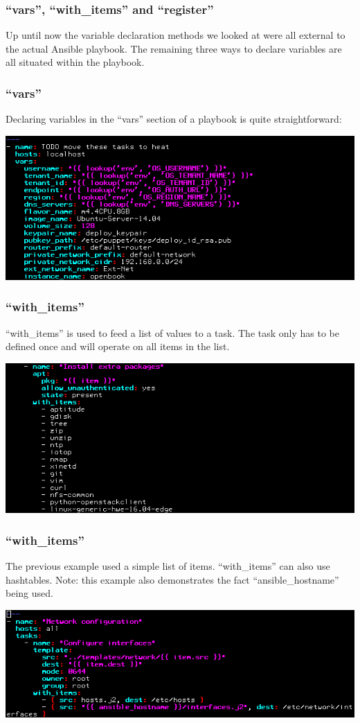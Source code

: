 \documentclass[helvetica,english,utf8,notitle,nologo]{beamer}
\begin{document}
\begin{frame}
  \frametitle{``vars'', ``with\_items'' and ``register''}

  Up until now the variable declaration methods we looked at were all
  external to the actual Ansible playbook. The remaining three ways to
  declare variables are all situated within the playbook.
\end{frame}

\begin{frame}
  \frametitle{``vars''}

  Declaring variables in the ``vars'' section of a playbook is quite
  straightforward:

  \includegraphics[scale=0.44]{img_14}
\end{frame}

\begin{frame}
  \frametitle{``with\_items''}

  ``with\_items'' is used to feed a list of values to a task. The task
  only has to be defined once and will operate on all items in the
  list.

  \includegraphics[scale=0.44]{img_12}
\end{frame}

\begin{frame}
  \frametitle{``with\_items''}

  The previous example used a simple list of items. ``with\_items''
  can also use hashtables. Note: this example also demonstrates the
  fact ``ansible\_hostname'' being used.

  \includegraphics[scale=0.44]{img_13}
\end{frame}
\end{document}
